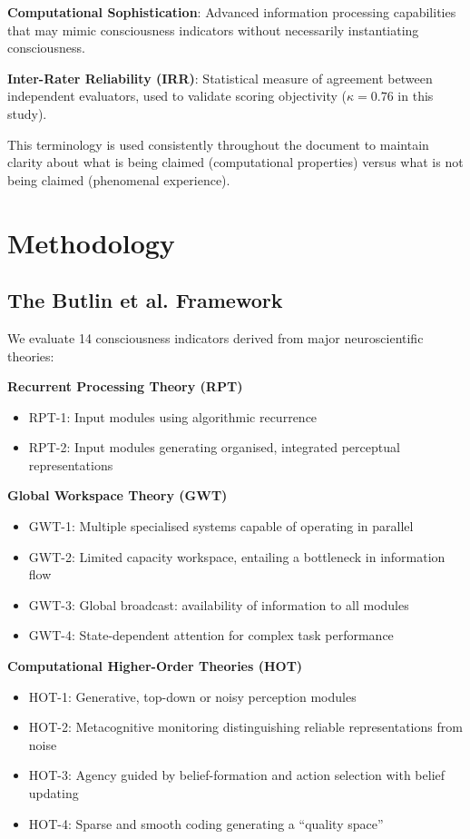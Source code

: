 \documentclass[12pt,a4paper]{article}
\begin{document}
\textbf{Computational Sophistication}: Advanced information processing capabilities that may mimic consciousness indicators without necessarily instantiating consciousness.

\textbf{Inter-Rater Reliability (IRR)}: Statistical measure of agreement between independent evaluators, used to validate scoring objectivity ($\kappa = 0.76$ in this study).

This terminology is used consistently throughout the document to maintain clarity about what is being claimed (computational properties) versus what is not being claimed (phenomenal experience).

\section{Methodology}

\subsection{The Butlin et al. Framework}

We evaluate 14 consciousness indicators derived from major neuroscientific theories:

\textbf{Recurrent Processing Theory (RPT)}
\begin{itemize}
    \item RPT-1: Input modules using algorithmic recurrence
    \item RPT-2: Input modules generating organised, integrated perceptual representations
\end{itemize}

\textbf{Global Workspace Theory (GWT)}
\begin{itemize}
    \item GWT-1: Multiple specialised systems capable of operating in parallel
    \item GWT-2: Limited capacity workspace, entailing a bottleneck in information flow
    \item GWT-3: Global broadcast: availability of information to all modules
    \item GWT-4: State-dependent attention for complex task performance
\end{itemize}

\textbf{Computational Higher-Order Theories (HOT)}
\begin{itemize}
    \item HOT-1: Generative, top-down or noisy perception modules
    \item HOT-2: Metacognitive monitoring distinguishing reliable representations from noise
    \item HOT-3: Agency guided by belief-formation and action selection with belief updating
    \item HOT-4: Sparse and smooth coding generating a ``quality space''
\end{itemize}
\end{document}
